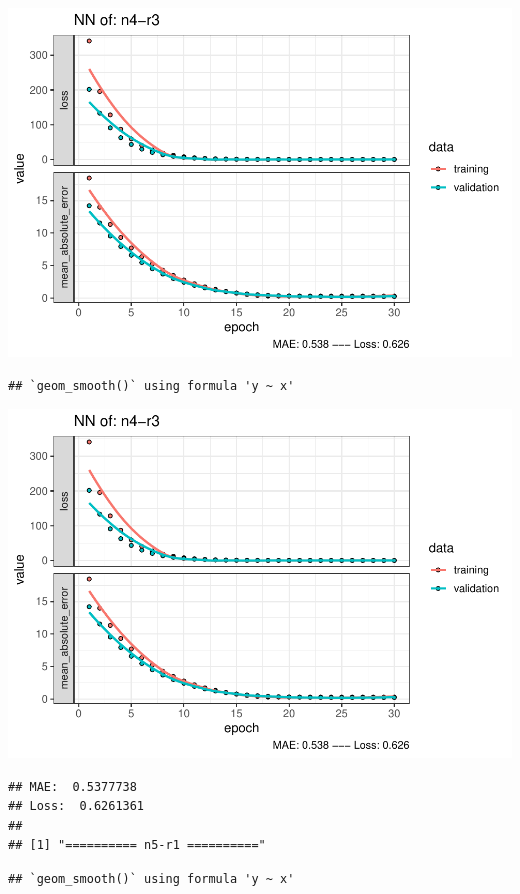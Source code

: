 \documentclass[
]{article}
\begin{document}
\includegraphics{project-code_files/figure-latex/unnamed-chunk-18-33.pdf}

\begin{verbatim}
## `geom_smooth()` using formula 'y ~ x'
\end{verbatim}

\includegraphics{project-code_files/figure-latex/unnamed-chunk-18-34.pdf}

\begin{verbatim}
## MAE:  0.5377738
## Loss:  0.6261361 
## 
## [1] "========== n5-r1 =========="
\end{verbatim}

\begin{verbatim}
## `geom_smooth()` using formula 'y ~ x'
\end{verbatim}
\end{document}
